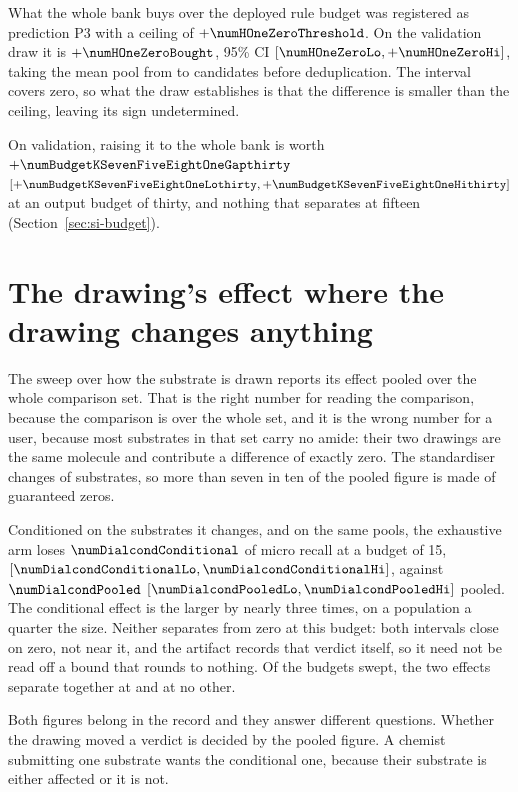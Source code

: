 \documentclass[journal=jcisd8,manuscript=suppinfo,layout=onecolumn]{achemso}
\begin{document}
What the whole bank buys over the deployed rule budget was registered as prediction P3 with a
ceiling of $+\numHOneZeroThreshold$. On the validation draw it is $+\numHOneZeroBought$, 95\%
CI $[\numHOneZeroLo, +\numHOneZeroHi]$, taking the mean pool from \numHOneZeroPoolBank{} to
\numHOneZeroPoolTrained{} candidates before deduplication. The interval covers zero, so what the
draw establishes is that the difference is smaller than the ceiling, leaving its sign undetermined.


On validation, raising it to the whole bank is worth
$+\numBudgetKSevenFiveEightOneGapthirty$
$[+\numBudgetKSevenFiveEightOneLothirty, +\numBudgetKSevenFiveEightOneHithirty]$ at an output
budget of thirty, and nothing that separates at fifteen (Section~\ref{sec:si-budget}).
\section{The drawing's effect where the drawing changes anything}
\label{sec:si-dialcond}

The sweep over how the substrate is drawn reports its effect pooled over the whole comparison set.
That is the right number for reading the comparison, because the comparison is over the whole set,
and it is the wrong number for a user, because most substrates in that set carry no amide: their
two drawings are the same molecule and contribute a difference of exactly zero. The standardiser
changes \numDialcondChanged{} of \numDialcondSubstrates{} substrates, so more than seven in ten of
the pooled figure is made of guaranteed zeros.

Conditioned on the substrates it changes, and on the same pools, the exhaustive arm loses
$\numDialcondConditional$ of micro recall at a budget of 15,
$[\numDialcondConditionalLo, \numDialcondConditionalHi]$, against $\numDialcondPooled$
$[\numDialcondPooledLo, \numDialcondPooledHi]$ pooled. The conditional effect is the larger by
nearly three times, on a population a quarter the size. Neither separates from zero at this budget:
both intervals close on zero, not near it, and the artifact records that verdict itself, so it
need not be read off a bound that rounds to nothing. Of the \numDialcondNbudgetsWord{} budgets
swept, the two
effects separate together at \numDialcondBothsepat{} and at no other.

Both figures belong in the record and they answer different questions. Whether the drawing moved a
verdict is decided by the pooled figure. A chemist submitting one substrate wants the
conditional one, because their substrate is either affected or it is not.
\end{document}
